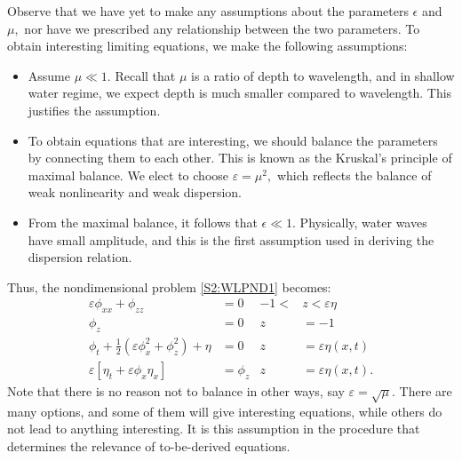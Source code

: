 Observe that we have yet to make any assumptions about the parameters $\epsilon$ and $\mu,$ nor have we prescribed any relationship between the two parameters. To obtain interesting limiting equations, we make the following assumptions:
\begin{itemize}
\item Assume $\mu \ll 1.$ Recall that $\mu$ is a ratio of depth to wavelength, and in shallow water regime, we expect depth is much smaller compared to wavelength. This justifies the assumption.
\item To obtain equations that are interesting, we should balance the parameters by connecting them to each other. This is known as the Kruskal's principle of maximal balance. We elect to choose $\varepsilon = \mu^2,$ which reflects the balance of weak nonlinearity and weak dispersion.
\item From the maximal balance, it follows that $\epsilon \ll 1.$ Physically, water waves have small amplitude, and this is the first assumption used in deriving the dispersion relation.
\end{itemize}
Thus, the nondimensional problem \eqref{S2:WLPND1} becomes:
\begin{subequations}\label{S2:WLPND2}
\begin{align}
\label{S2:PDEND2}  \varepsilon\phi_{xx} + \phi_{zz} &= 0 &-1 <&z < \varepsilon\eta \\
\label{S2:BC1ND2} \phi_z &= 0 &z &= -1  \\ 
\label{S2:BC2ND2} \phi_{t} + \frac{1}{2} \left(\varepsilon\phi_{x}^2 + \phi_{z}^2\right) + \eta &= 0 &z &= \varepsilon\eta(x,t)\\
\label{S2:BC3ND2} \varepsilon\left[\eta_{t} + \varepsilon \phi_{x} \eta_{x}\right] &= \phi_{z} &z &= \varepsilon\eta(x,t).
\end{align}
\end{subequations}
Note that there is no reason not to balance in other ways, say $\varepsilon = \sqrt{\mu}.$ There are many options, and some of them will give interesting equations, while others do not lead to anything interesting. It is this assumption in the procedure that determines the relevance of to-be-derived equations.

